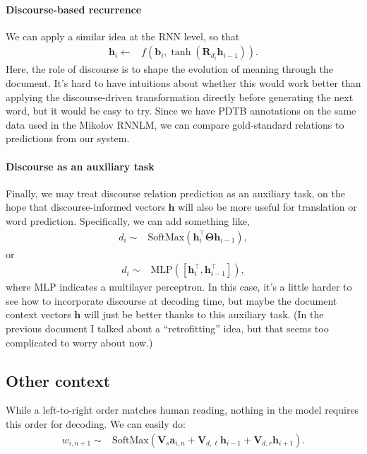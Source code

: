 \documentclass[11pt,a4paper]{article}
\newcommand{\trans}[1]{#1^{\top}}
\renewcommand{\vec}[1]{\mathbf{#1}}
\newcommand{\vh}[0]{\vec{h}}
\newcommand{\va}[0]{\vec{a}}
\newcommand{\vb}[0]{\vec{b}}
\newcommand{\mat}[1]{\bm{#1}}
\begin{document}
\paragraph{Discourse-based recurrence}
We can apply a similar idea at the RNN level, so that 
\begin{align}
\vh_i \leftarrow & f(\vb_i, \tanh(\mat{R}_{d_i} \vh_{i-1})).
\end{align}
Here, the role of discourse is to shape the evolution of meaning through the document. It's hard to have intuitions about whether this would work better than applying the discourse-driven transformation directly before generating the next word, but it would be easy to try. Since we have PDTB annotations on the same data used in the Mikolov RNNLM, we can compare gold-standard relations to predictions from our system.

\paragraph{Discourse as an auxiliary task}
Finally, we may treat discourse relation prediction as an auxiliary task, on the hope that discourse-informed vectors $\vh$ will also be more useful for translation or word prediction. Specifically, we can add something like,
\begin{align}
d_i \sim & \text{SoftMax}(\trans{\vh_{i}}\mat{\Theta} \vh_{i-1}),
\end{align}
or
\begin{align}
d_i \sim & \text{MLP}([\trans{\vh}_{i}, \trans{\vh}_{i-1}]),
\end{align}
where $\text{MLP}$ indicates a multilayer perceptron. In this case, it's a little harder to see how to incorporate discourse at decoding time, but maybe the document context vectors $\vh$ will just be better thanks to this auxiliary task. (In the previous document I talked about a ``retrofitting'' idea, but that seems too complicated to worry about now.)

\subsection{Other context}
While a left-to-right order matches human reading, nothing in the model requires this order for decoding. We can easily do:
\begin{align}
w_{i,n+1} \sim & \text{SoftMax}(\mat{V}_s \va_{i,n} + \mat{V}_{d,\ell} \vh_{i-1} + \mat{V}_{d,r} \vh_{i+1}).
\end{align}
\end{document}
